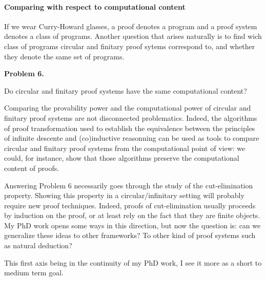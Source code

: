 \documentclass[11pt,twocolumn]{article}
\begin{document}
\paragraph{Comparing with respect to computational content}

If we wear Curry-Howard glasses, a proof denotes a program and a proof system denotes a class
of programs. Another question that arises naturally is to find wich class of programs circular and finitary proof sytems correspond to, and whether they denote the same set of programs.
 
\begin{center}
\begin{bclogo}[logo= ,arrondi = 0.1, couleur = green!10,  epBarre = 0]{}
  \vspace{-10pt}
  \textbf{Problem 6.}

Do circular and finitary proof systems have the same computational content?
\end{bclogo}
\end{center}

Comparing the provability power and the computational power of  circular and finitary proof systems are not disconnected problematics. Indeed, the algorithms of proof transformation used to establish the equivalence between the principles of infinite descente and (co)inductive reasonning can be used as tools to compare circular and finitary proof systems from the computational point of view: we could, for instance, show that those algorithms preserve the computational content of proofs.   


\smallskip

Answering Problem 6 necessarily goes through the study of the cut-elimination property.
Showing this property in a circular/infinitary setting will probably require new proof techniques. Indeed, proofs of cut-elimination usually proceeds by induction on the proof, or at least rely on the fact that they are finite objects. 
My PhD work opens some ways in this direction, but now the question is: can we generalize these ideas to other frameworks? To other kind of proof systems such as natural deduction? 


\bigskip

This first axis being in the continuity of my PhD work, I see it more as a short to medium term goal.
  




\end{document}
